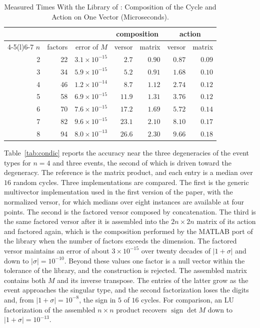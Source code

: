 \documentclass[journal]{IEEEtran}
\newcommand{\sgn}{\operatorname{sign}}
\begin{document}
\begin{table}[!h]
\caption{Measured Times With the Library of \cite{eid2025gafl}: Composition
of the Cycle and Action on One Vector (Microseconds).}
\label{tab:tiempos}
\centering
\footnotesize
\setlength{\tabcolsep}{4pt}
\begin{tabular}{@{}rrrrrrr@{}}
\toprule
 & & & \multicolumn{2}{c}{composition} & \multicolumn{2}{c}{action} \\
\cmidrule(lr){4-5}\cmidrule(l){6-7}
$n$ & factors & error of $M$ & versor & matrix & versor & matrix \\
\midrule
2 & 22 & $3.1\times10^{-15}$ & $2.7$ & $0.90$ & $0.87$ & $0.09$ \\
3 & 34 & $5.9\times10^{-15}$ & $5.2$ & $0.91$ & $1.68$ & $0.10$ \\
4 & 46 & $1.2\times10^{-14}$ & $8.7$ & $1.12$ & $2.74$ & $0.12$ \\
5 & 58 & $6.9\times10^{-15}$ & $11.9$ & $1.31$ & $3.76$ & $0.12$ \\
6 & 70 & $7.6\times10^{-15}$ & $17.2$ & $1.69$ & $5.72$ & $0.14$ \\
7 & 82 & $9.6\times10^{-15}$ & $23.1$ & $2.10$ & $8.10$ & $0.17$ \\
8 & 94 & $8.0\times10^{-13}$ & $26.6$ & $2.30$ & $9.66$ & $0.18$ \\
\bottomrule
\end{tabular}
\end{table}

Table~\ref{tab:condic} reports the accuracy near the three degeneracies of
the event types for $n=4$ and three events, the second of which is driven
toward the degeneracy. The reference is the matrix product, and each entry
is a median over $16$ random cycles. Three implementations are compared.
The first is the generic multivector implementation used in the first
version of the paper, with the normalized versor, for which medians over
eight instances are available at four points. The second is the factored
versor composed by concatenation. The third is the same factored versor
after it is assembled into the $2n\times2n$ matrix of its action and
factored again, which is the composition performed by the MATLAB port of
the library when the number of factors exceeds the dimension. The factored
versor maintains an error of about $3\times10^{-15}$ over twenty decades of
$\lvert1+\sigma\rvert$ and down to $\lvert\sigma\rvert=10^{-10}$. Beyond
these values one factor is a null vector within the tolerance of the
library, and the construction is rejected. The assembled matrix contains
both $M$ and its inverse transpose. The entries of the latter grow as the
event approaches the singular type, and the second factorization loses the
digits and, from $\lvert1+\sigma\rvert=10^{-8}$, the sign in $5$ of $16$
cycles. For comparison, an LU factorization of the assembled $n\times n$
product recovers $\sgn\det M$ down to $\lvert1+\sigma\rvert=10^{-13}$.
\end{document}
